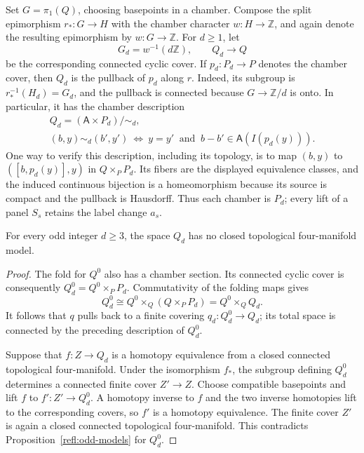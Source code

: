 Set \(G=\pi_1(Q)\), choosing basepoints in a chamber.  Compose the
split epimorphism \(r_*:G\to H\) with the chamber character
\(w:H\to\mathbb Z\), and again denote the resulting epimorphism by
\(w:G\to\mathbb Z\).  For \(d\geq1\), let
\[
 G_d=w^{-1}(d\mathbb Z),\qquad Q_d\longrightarrow Q
\]
be the corresponding connected cyclic cover.  If
\(p_d:P_d\to P\) denotes the chamber cover, then \(Q_d\) is the
pullback of \(p_d\) along \(r\).  Indeed, its subgroup is
\(r_*^{-1}(H_d)=G_d\), and the pullback is connected because
\(G\to\mathbb Z/d\) is onto.  In particular, it has the chamber
description
\begin{equation}\label{mod:cyclic-chambers}
 \begin{gathered}
 Q_d=(\mathsf A\times P_d)/\sim_d,\\
 (b,y)\sim_d(b',y')
 \ \Longleftrightarrow\
 y=y'\ \text{ and }\
 b-b'\in\mathsf A(I(p_d(y))).
 \end{gathered}
\end{equation}
One way to verify this description, including its topology, is to map
\((b,y)\) to \(([b,p_d(y)],y)\) in \(Q\times_P P_d\).  Its fibers are
the displayed equivalence classes, and the induced continuous
bijection is a homeomorphism because its source is compact and the
pullback is Hausdorff.  Thus each chamber is \(P_d\); every lift of a
panel \(S_s\) retains the label change \(a_s\).

\begin{proposition}\label{mod:odd-models}
For every odd integer \(d\geq3\), the space \(Q_d\) has no closed
topological four-manifold model.
\end{proposition}

\begin{proof}
The fold for \(Q^0\) also has a chamber section.  Its connected cyclic
cover is consequently \(Q^0_d=Q^0\times_P P_d\).  Commutativity of
the folding maps gives
\[
 Q^0_d
   \cong Q^0\times_Q(Q\times_P P_d)
   =Q^0\times_Q Q_d.
\]
It follows that \(q\) pulls back to a finite covering
\(q_d:Q^0_d\to Q_d\); its total space is connected by the preceding
description of \(Q^0_d\).

Suppose that \(f:Z\to Q_d\) is a homotopy equivalence from a closed
connected topological four-manifold.  Under the isomorphism \(f_*\),
the subgroup defining \(Q^0_d\) determines a connected finite cover
\(Z'\to Z\).  Choose compatible basepoints and lift \(f\) to
\(f':Z'\to Q^0_d\).  A homotopy inverse to \(f\) and the two inverse
homotopies lift to the corresponding covers, so \(f'\) is a homotopy
equivalence.  The finite cover \(Z'\) is again a closed connected
topological four-manifold.  This contradicts
Proposition~\ref{refl:odd-models} for \(Q^0_d\).
\end{proof}

